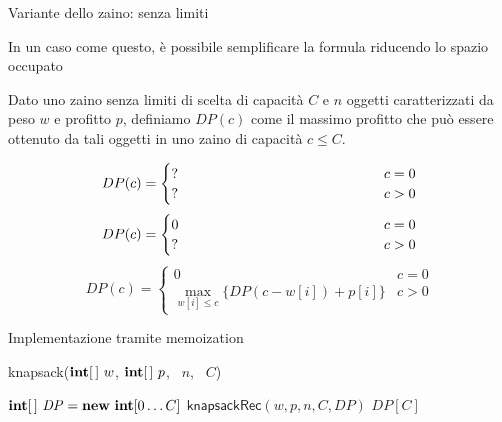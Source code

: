 \begin{frame}{Variante dello zaino: senza limiti}

\vspace{-9pt}
\begin{myboxtitle}
In un caso come questo, è possibile semplificare la formula riducendo
lo spazio occupato
\end{myboxtitle}

\begin{myboxtitle}
Dato uno zaino senza limiti di scelta di capacità $C$ e $n$ oggetti caratterizzati
da peso $w$ e profitto $p$, definiamo $\mathit{DP}(c)$ come il
massimo profitto che può essere ottenuto da tali oggetti
in uno zaino di capacità $c \leq  C$.
\end{myboxtitle}

\begin{overprint}
\[
DP(c) = \begin{cases}
  \makebox[5cm][l]{?} & c=0 \\
  \makebox[5cm][l]{?} & c>0
\end{cases}
\]
\[
DP(c) = \begin{cases}
  0 & c=0 \\
  \makebox[5cm][l]{?} & c>0
\end{cases}
\]
\[
DP(c) = \begin{cases}
  0 & c=0 \\
  \max_{w[i] \leq c} \{ \mathit{DP}(c-w[i])+p[i] \} & c>0
\end{cases}
\]
\end{overprint}

\end{frame}

\begin{frame}{Implementazione tramite memoization}

\vspace{-9pt}
\begin{Procedure}
\caption[A]{\textsf{knapsack}($\INTEGER[\,]\ w$, $\INTEGER[\,]\ p$, \INTEGER\ $n$, \INTEGER\ $C$)}
  $\INTEGER[\,]\ \mathit{DP} = \NEW\ \INTEGER[0 \ldots C]$\;
  $\textsf{knapsackRec}(w, p, n, C, \mathit{DP})$\;
  \Return $\mathit{DP}[C]$\;
\end{Procedure}
\end{frame}
  
